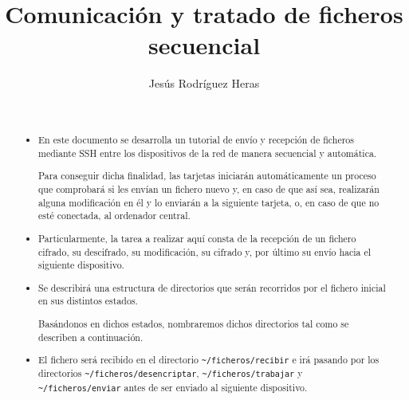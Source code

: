 \documentclass[12pt,letterpaper]{article}
\title{Comunicación y tratado de ficheros secuencial}
\author{Jesús Rodríguez Heras}
\begin{document}
	
	\maketitle
	\begin{abstract} %
		~
		\begin{itemize}
			\item En este documento se desarrolla un tutorial de envío y recepción de ficheros mediante SSH entre los dispositivos de la red de manera secuencial y automática.
			
			Para conseguir dicha finalidad, las tarjetas iniciarán automáticamente un proceso que comprobará si les envían un fichero nuevo y, en caso de que así sea, realizarán alguna modificación en él y lo enviarán a la siguiente tarjeta, o, en caso de que no esté conectada, al ordenador central.
			
			\item Particularmente, la tarea a realizar aquí consta de la recepción de un fichero cifrado, su descifrado, su modificación, su cifrado y, por último su envío hacia el siguiente dispositivo.
			
			\item Se describirá una estructura de directorios que serán recorridos por el fichero inicial en sus distintos estados.
			
			Basándonos en dichos estados, nombraremos dichos directorios tal como se describen a continuación.
			
			\item El fichero será recibido en el directorio \texttt{\textasciitilde/ficheros/recibir} e irá pasando por los directorios \texttt{\textasciitilde/ficheros/desencriptar}, \texttt{\textasciitilde/ficheros/trabajar} y \\ \texttt{\textasciitilde/ficheros/enviar} antes de ser enviado al siguiente dispositivo.
		\end{itemize}
	\end{abstract}
	\thispagestyle{empty}
	\newpage
	
	\tableofcontents
	\newpage
	
	
	
	
	\lstset{language=bash, numbers=left, numberstyle=\tiny, numbersep=10pt, firstnumber=1, stepnumber=1, basicstyle=\small\ttfamily, tabsize=2, extendedchars=true, inputencoding=utf8/latin1, breaklines=true}
	
\end{document}
